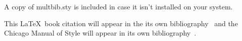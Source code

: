 \documentclass{article}
\begin{document}
A copy of multbib.sty is included in case it isn't installed on your system.

This \LaTeX\ book citation will appear in the its own bibliography~ and the Chicago Manual of Style will appear in its own bibliography~\cite{chicago}.


\renewcommand{\refname}{Other references}


\end{document}
